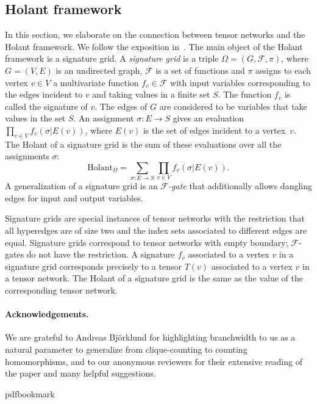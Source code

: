 \documentclass[11pt]{article}
\numberwithin{equation}{section}
\theoremstyle{definition}
\theoremstyle{plain}
\begin{document}
\subsection{Holant framework} \label{sec:Holant_theory}

In this section, we elaborate on the connection between tensor networks and the Holant framework. We follow the exposition in~\cite{CaiLX2011}. The main object of the Holant framework is a signature grid. A \emph{signature grid} is a triple $\Omega = (G,\mathcal{F},\pi)$, where $G=(V,E)$ is an undirected graph, $\mathcal{F}$ is a set of functions and $\pi$ assigns to each vertex $v \in V$ a multivariate function $f_v \in \mathcal{F}$ with input variables corresponding to the edges incident to $v$ and taking values in a finite set $S$. The function $f_v$ is called the signature of $v$. The edges of $G$ are considered to be variables that take values in the set $S$. An assignment $\sigma : E \rightarrow S$ gives an evaluation $\prod_{v \in V} f_v(\sigma|E(v))$, where $E(v)$ is the set of edges incident to a vertex~$v$. The Holant of a signature grid is the sum of these evaluations over all the assignments $\sigma$:
$$
\text{Holant}_{\Omega}=\sum_{\sigma:E \rightarrow S} \prod_{v \in V} f_v(\sigma|E(v)).
$$
A generalization of a signature grid is an \emph{$\mathcal{F}$-gate} that additionally allows dangling edges for input and output variables.

Signature grids are special instances of tensor networks with the restriction that all hyperedges are of size two and the index sets associated to different edges are equal. Signature grids correspond to tensor networks with empty boundary; $\mathcal{F}$-gates do not have the restriction. A signature $f_v$ associated to a vertex $v$ in a signature grid corresponds precisely to a tensor $T(v)$ associated to a vertex $v$ in a tensor network.  The Holant of a signature grid is the same as the value of the corresponding tensor network.


\paragraph{Acknowledgements.}  We are grateful to Andreas Bj\"orklund for highlighting branchwidth
to us as a natural parameter to generalize from clique-counting to counting
homomorphisms, and to our anonymous reviewers for their extensive reading of the paper and many helpful suggestions.

\newcommand{\prelim}{Preliminary version in\ }\newcommand{\prelims}{Preliminary
  versions in\ }
\providecommand{\bibhead}[1]{}
\expandafter\ifx\csname pdfbookmark\endcsname\relax%
  \providecommand{\tocrefpdfbookmark}{}
\else\providecommand{\tocrefpdfbookmark}{%
   \hypertarget{tocreferences}{}%
   \pdfbookmark[1]{References}{tocreferences}}%
\fi
\end{document}
